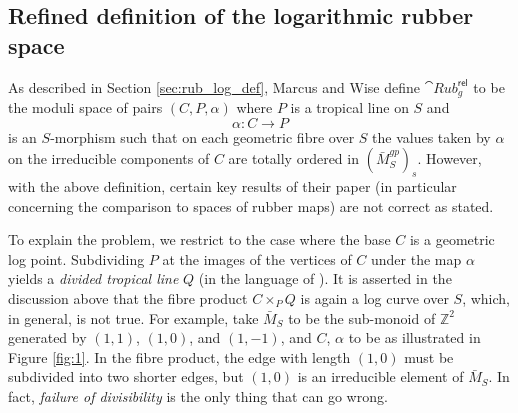 \subsection{Refined definition of the logarithmic rubber space}

As described in Section \ref{sec:rub_log_def}, Marcus and Wise define $\cat{Rub}^{\mathsf{rel}}_{g}$ to be the moduli space of pairs $(C,P, \alpha)$ where $P$ is a tropical line on $S$ and $$\alpha\colon C \to P$$ is an $S$-morphism such that on each geometric fibre over $S$ the values taken by $\alpha$ on the irreducible components of $C$ are totally ordered in $(\bar{M}_S^{gp})_s$. However, with the above definition, certain key results of their paper (in particular concerning the comparison to spaces of rubber maps) are not correct as stated.

To explain the problem, we restrict to the case where the base $C$ is a geometric log point. Subdividing $P$ at the images of the vertices of $C$ under the map $\alpha$ yields a \emph{divided tropical line} $Q$ (in the language of \cite{Marcus2017Logarithmic-com}). It is asserted in the discussion above \cite[]{Marcus2017Logarithmic-com} that the fibre product $C \times_P Q$ is again a log curve over $S$, which, in general,
is not true. For example, take $\bar M_S$ to be the sub-monoid of $\mathbb Z^2$ generated by $(1,1)$, $(1,0)$, and $(1,-1)$, and $C$, $\alpha$ to be as illustrated in Figure \ref{fig:1}. In the fibre product,
the edge with length $(1,0)$ must be subdivided into two shorter edges, but $(1,0)$
is an irreducible element of $\bar M_S$.
In fact, {\em failure of divisibility} is the only thing that can go wrong.

